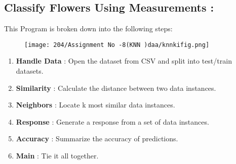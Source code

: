 \documentclass{article}
\begin{document}
	\subsection{Classify Flowers Using Measurements :}
	This Program is broken down into the following steps:\\
	\newpage
	\begin{figure}[h!]
		\centering
		\texttt{[image: 204/Assignment No -8(KNN )daa/knnkifig.png]}
	\end{figure}
	\begin{enumerate}
		\item \textbf{Handle Data} : Open the dataset from CSV and split into test/train datasets.
		\item \textbf{Similarity}  : Calculate the distance between two data instances.
		\item \textbf{Neighbors}   : Locate k most similar data instances.
		\item \textbf{Response}    : Generate a response from a set of data instances.
		\item \textbf{Accuracy}    : Summarize the accuracy of predictions.
		\item \textbf{Main}        : Tie it all together.
	\end{enumerate}
\end{document}
